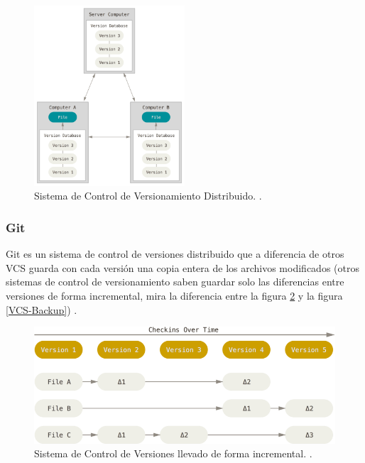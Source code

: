 \begin{figure}
  \begin{center}
      \includegraphics[width=0.5\textwidth]{Figures/dvcs.png}
  \end{center}
  \caption{Sistema de Control de Versionamiento Distribuido. \citep{PROGIT-Git-VCS}.}
  \label{DVCS}
\end{figure}

\subsubsection{Git}
Git es un sistema de control de versiones distribuido que a diferencia de otros VCS guarda con cada versión una copia entera de los archivos modificados (otros sistemas de control de versionamiento saben guardar solo las diferencias entre versiones de forma incremental, mira la diferencia entre la figura \ref{VCS-Incremental} y la figura \ref{VCS-Backup}) \citep{PROGIT-Git-Intro}.

\begin{figure}
  \begin{center}
      \includegraphics[width=\textwidth]{Figures/vcs-incremental.png}
  \end{center}
  \caption{Sistema de Control de Versiones  llevado de forma incremental. \citep{PROGIT-Git-Intro}.}
  \label{VCS-Incremental}
\end{figure}


